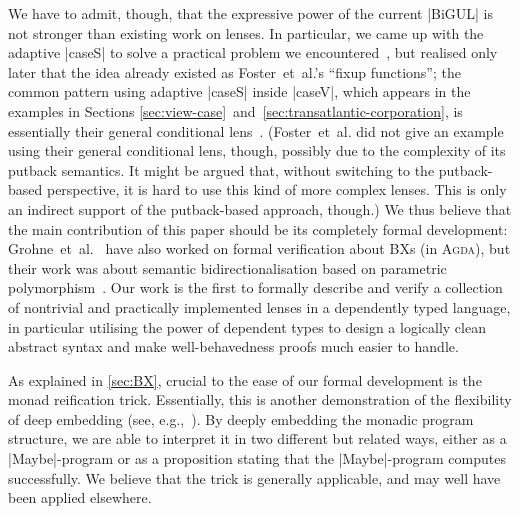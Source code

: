 \documentclass{sigplanconf}
\newcommand{\Agda}{\textsc{Agda}}
\begin{document}
We have to admit, though, that the expressive power of the current |BiGUL| is not stronger than existing work on lenses.
In particular, we came up with the adaptive |caseS| to solve a practical problem we encountered~\cite{Zhu-BiYacc}, but realised only later that the idea already existed as Foster~et~al.'s ``fixup functions''; the common pattern using adaptive |caseS| inside |caseV|, which appears in the examples in Sections \ref{sec:view-case}~and~\ref{sec:transatlantic-corporation}, is essentially their general conditional lens~\cite[Section~6.3]{Foster-lenses}.
(Foster~et~al{.} did not give an example using their general conditional lens, though, possibly due to the complexity of its putback semantics.
It might be argued that, without switching to the putback-based perspective, it is hard to use this kind of more complex lenses.
This is only an indirect support of the putback-based approach, though.)
We thus believe that the main contribution of this paper should be its completely formal development:
Grohne~et~al.~\cite{Grohne-formalizing-semantic-bidirectionalization} have also worked on formal verification about BXs (in \Agda), but their work was about semantic bidirectionalisation based on parametric polymorphism~\cite{Voigtlander-BX-for-free}.
Our work is the first to formally describe and verify a collection of nontrivial and practically implemented lenses in a dependently typed language, in particular utilising the power of dependent types to design a logically clean abstract syntax and make well-behavedness proofs much easier to handle.


As explained in \autoref{sec:BX}, crucial to the ease of our formal development is the monad reification trick.
Essentially, this is another demonstration of the flexibility of deep embedding (see, e.g.,~\cite{Gibbons-DSL}).
By deeply embedding the monadic program structure, we are able to interpret it in two different but related ways, either as a |Maybe|-program or as a proposition stating that the |Maybe|-program computes successfully.
We believe that the trick is generally applicable, and may well have been applied elsewhere.
\end{document}
